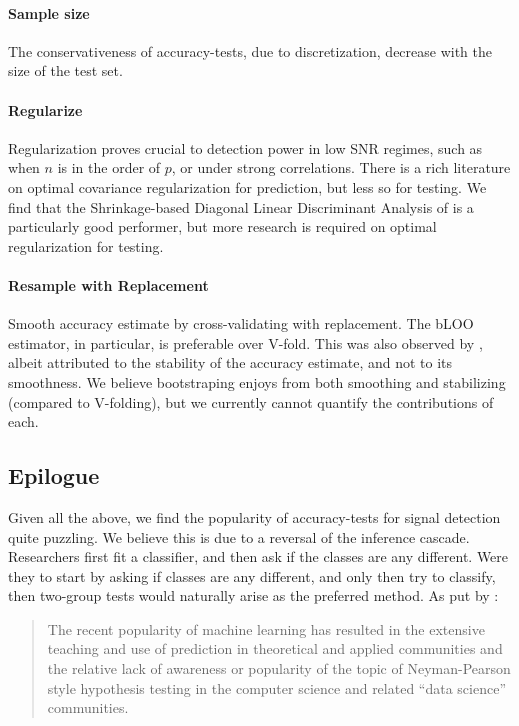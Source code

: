 \documentclass[oupdraft]{bio}
\begin{document}
\paragraph{Sample size} The conservativeness of accuracy-tests, due to discretization, decrease with the size of the test set. 

\paragraph{Regularize}
Regularization proves crucial to detection power in low SNR regimes, such as when $n$ is in the order of $p$, or under strong correlations.
There is a rich literature on optimal covariance regularization for prediction, but less so for testing.
We find that the Shrinkage-based Diagonal Linear Discriminant Analysis of \cite{pang_shrinkage-based_2009} is a particularly good performer, but more research is required on optimal regularization for testing. 


\paragraph{Resample with Replacement}
Smooth accuracy estimate by cross-validating with replacement. 
The bLOO estimator, in particular, is preferable over V-fold.
This was also observed by \cite{yu2007two}, albeit attributed to the stability of the accuracy estimate, and not to its smoothness. 
We believe bootstraping enjoys from both smoothing and stabilizing (compared to V-folding), but we currently cannot quantify the contributions of each. 





\subsection{Epilogue}
Given all the above, we find the popularity of accuracy-tests for signal detection quite puzzling. 
We believe this is due to a reversal of the inference cascade. 
Researchers first fit a classifier, and then ask if the classes are any different.
Were they to start by asking if classes are any different, and only then try to classify, then two-group tests would naturally arise as the preferred method. 
As put by \cite{ramdas_classification_2016}:
\begin{quote}
	The recent popularity of machine learning has resulted in the extensive teaching and use
	of prediction in theoretical and applied communities and the relative lack of awareness or
	popularity of the topic of Neyman-Pearson style hypothesis testing in the computer science
	and related ``data science'' communities.
\end{quote}
\end{document}
